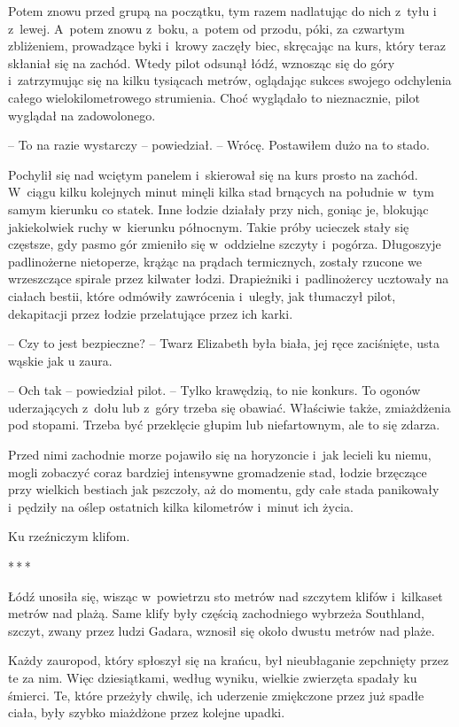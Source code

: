 \documentclass[oneside,polish,12pt,sfheadings]{mwbk}
\newcommand{\threeast}{\bigskip\par\centerline{*\,*\,*}\medskip\par}%
\begin{document}
Potem znowu przed grupą na początku, tym razem nadlatując do nich z~tyłu
i z~lewej. A~potem znowu z~boku, a~potem od przodu, póki, za czwartym
zbliżeniem, prowadzące byki i~krowy zaczęły biec, skręcając na kurs,
który teraz skłaniał się na zachód. Wtedy pilot odsunął łódź, wznosząc
się do góry i~zatrzymując się na kilku tysiącach metrów, oglądając
sukces swojego odchylenia całego wielokilometrowego strumienia. Choć
wyglądało to nieznacznie, pilot wyglądał na zadowolonego.

-- To na razie wystarczy -- powiedział. -- Wrócę. Postawiłem dużo na to
stado.

Pochylił się nad wciętym panelem i~skierował się na kurs prosto na
zachód. W~ciągu kilku kolejnych minut minęli kilka stad brnących na
południe w~tym samym kierunku co statek. Inne łodzie działały przy nich,
goniąc je, blokując jakiekolwiek ruchy w~kierunku północnym. Takie próby
ucieczek stały się częstsze, gdy pasmo gór zmieniło się w~oddzielne
szczyty i~pogórza. Długoszyje padlinożerne nietoperze, krążąc na prądach
termicznych, zostały rzucone we wrzeszczące spirale przez kilwater
łodzi. Drapieżniki i~padlinożercy ucztowały na ciałach bestii, które
odmówiły zawrócenia i~uległy, jak tłumaczył pilot, dekapitacji przez
łodzie przelatujące przez ich karki.

-- Czy to jest bezpieczne? -- Twarz Elizabeth była biała, jej ręce
zaciśnięte, usta wąskie jak u zaura.

-- Och tak -- powiedział pilot. -- Tylko krawędzią, to nie konkurs. To
ogonów uderzających z~dołu lub z~góry trzeba się obawiać. Właściwie
także, zmiażdżenia pod stopami. Trzeba być przeklęcie głupim lub
niefartownym, ale to się zdarza.

Przed nimi zachodnie morze pojawiło się na horyzoncie i~jak lecieli ku
niemu, mogli zobaczyć coraz bardziej intensywne gromadzenie stad, łodzie
brzęczące przy wielkich bestiach jak pszczoły, aż do momentu, gdy całe
stada panikowały i~pędziły na oślep ostatnich kilka kilometrów i~minut
ich życia.

Ku rzeźniczym klifom.

\threeast

Łódź unosiła się, wisząc w~powietrzu sto metrów nad szczytem klifów i~kilkaset metrów nad plażą. Same klify były częścią zachodniego wybrzeża
Southland, szczyt, zwany przez ludzi Gadara, wznosił się około dwustu
metrów nad plaże.

Każdy zauropod, który spłoszył się na krańcu, był nieubłaganie
zepchnięty przez te za nim. Więc dziesiątkami, według wyniku, wielkie
zwierzęta spadały ku śmierci. Te, które przeżyły chwilę, ich uderzenie
zmiękczone przez już spadłe ciała, były szybko miażdżone przez kolejne
upadki.
\end{document}
